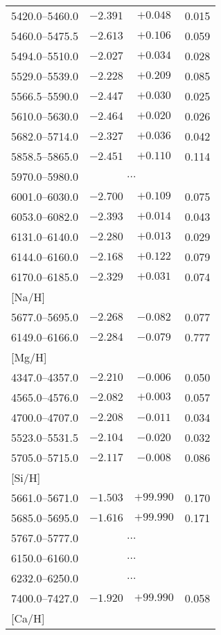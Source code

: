 \documentclass{aa}
\begin{document}
\begin{appendix}
\begin{table}
{\begin{tabular}{lccc}
5420.0--5460.0 & $-2.391$ & $+0.048$ & 0.015 \\
5460.0--5475.5 & $-2.613$ & $+0.106$ & 0.059 \\
5494.0--5510.0 & $-2.027$ & $+0.034$ & 0.028 \\
5529.0--5539.0 & $-2.228$ & $+0.209$ & 0.085 \\
5566.5--5590.0 & $-2.447$ & $+0.030$ & 0.025 \\
5610.0--5630.0 & $-2.464$ & $+0.020$ & 0.026 \\
5682.0--5714.0 & $-2.327$ & $+0.036$ & 0.042 \\
5858.5--5865.0 & $-2.451$ & $+0.110$ & 0.114 \\
5970.0--5980.0 & \multicolumn{2}{c}{$\ldots$} \\
6001.0--6030.0 & $-2.700$ & $+0.109$ & 0.075 \\
6053.0--6082.0 & $-2.393$ & $+0.014$ & 0.043 \\
6131.0--6140.0 & $-2.280$ & $+0.013$ & 0.029 \\
6144.0--6160.0 & $-2.168$ & $+0.122$ & 0.079 \\
6170.0--6185.0 & $-2.329$ & $+0.031$ & 0.074 \\
\mbox{[Na/H]} \\
5677.0--5695.0 & $-2.268$ & $-0.082$ & 0.077\\
6149.0--6166.0 & $-2.284$ & $-0.079$ & 0.777\\
\mbox{[Mg/H]} \\
4347.0--4357.0 & $-2.210$ & $-0.006$ & 0.050\\
4565.0--4576.0 & $-2.082$ & $+0.003$ & 0.057\\
4700.0--4707.0 & $-2.208$ & $-0.011$ & 0.034\\
5523.0--5531.5 & $-2.104$ & $-0.020$ & 0.032\\
5705.0--5715.0 & $-2.117$ & $-0.008$ & 0.086\\
\mbox{[Si/H]} \\
5661.0--5671.0 & $-1.503$ & $+99.990$ & 0.170\\
5685.0--5695.0 & $-1.616$ & $+99.990$ & 0.171\\
5767.0--5777.0 & \multicolumn{2}{c}{$\ldots$} \\
6150.0--6160.0 & \multicolumn{2}{c}{$\ldots$} \\
6232.0--6250.0 & \multicolumn{2}{c}{$\ldots$} \\
7400.0--7427.0 & $-1.920$ & $+99.990$ & 0.058\\
\mbox{[Ca/H]} \\

\end{tabular}}
\end{table}
\end{appendix}
\end{document}
